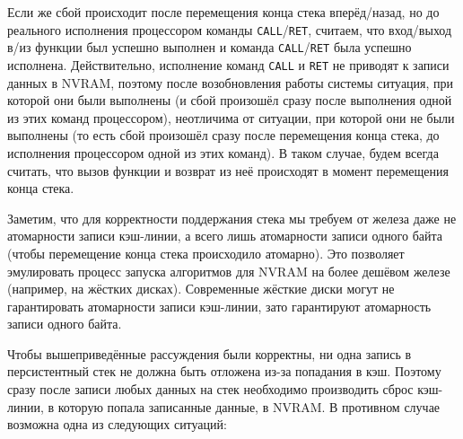 \documentclass[times,specification,annotation]{itmo-student-thesis}
\begin{document}
Если же сбой происходит после перемещения конца стека вперёд/назад, но до реального исполнения процессором команды \texttt{CALL}/\texttt{RET}, считаем, что вход/выход в/из функции был успешно выполнен и команда \texttt{CALL}/\texttt{RET} была успешно исполнена. Действительно, исполнение команд \texttt{CALL} и \texttt{RET} не приводят к записи данных в NVRAM, поэтому после возобновления работы системы ситуация, при которой они были выполнены (и сбой произошёл сразу после выполнения одной из этих команд процессором), неотличима от ситуации, при которой они не были выполнены (то есть сбой произошёл сразу после перемещения конца стека, до исполнения процессором одной из этих команд). В таком случае, будем всегда считать, что вызов функции и возврат из неё происходят в момент перемещения конца стека.

Заметим, что для корректности поддержания стека мы требуем от железа даже не атомарности записи кэш-линии, а всего лишь атомарности записи одного байта (чтобы перемещение конца стека происходило атомарно). Это позволяет эмулировать процесс запуска алгоритмов для NVRAM на более дешёвом железе (например, на жёстких дисках). Современные жёсткие диски могут не гарантировать атомарности записи кэш-линии, зато гарантируют атомарность записи одного байта.

Чтобы вышеприведённые рассуждения были корректны, ни одна запись в персистентный стек не должна быть отложена из-за попадания в кэш. Поэтому сразу после записи любых данных на стек необходимо производить сброс кэш-линии, в которую попала записанные данные, в NVRAM. В противном случае возможна одна из следующих ситуаций:
\end{document}
